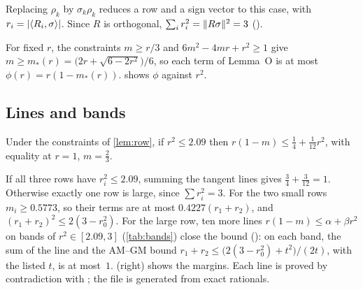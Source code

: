 \documentclass[11pt,a4paper]{article}
\begin{document}
Replacing $\rho_k$ by $\sigma_k\rho_k$ reduces a row and a sign vector to this case, with $r_i=\lvert \langle R_i,\sigma\rangle\rvert$. Since $R$ is orthogonal, $\sum_ir_i^2=\lVert R\sigma\rVert^2=3$ ().

For fixed $r$, the constraints $m\ge r/3$ and $6m^2-4mr+r^2\ge1$ give $m\ge m_*(r)=\bigl(2r+\sqrt{6-2r^2}\bigr)/6$, so each term of Lemma~O is at most $\phi(r)=r(1-m_*(r))$.  shows $\phi$ against $r^2$.

\subsection{Lines and bands}
\begin{lemma}
Under the constraints of \cref{lem:row}, if $r^2\le2.09$ then $r(1-m)\le\tfrac14+\tfrac1{12}r^2$, with equality at $r=1$, $m=\tfrac23$.
\end{lemma}

If all three rows have $r_i^2\le2.09$, summing the tangent lines gives $\tfrac34+\tfrac{3}{12}=1$. Otherwise exactly one row is large, since $\sum r_i^2=3$. For the two small rows $m_i\ge0.5773$, so their terms are at most $0.4227(r_1+r_2)$, and $(r_1+r_2)^2\le2(3-r_0^2)$. For the large row, ten more lines $r(1-m)\le\alpha+\beta r^2$ on bands of $r^2\in[2.09,3]$ (\cref{tab:bands}) close the bound (): on each band, the sum of the line and the AM--GM bound $r_1+r_2\le\bigl(2(3-r_0^2)+t^2\bigr)/(2t)$, with the listed $t$, is at most~$1$.  (right) shows the margins. Each line is proved by contradiction with ; the file  is generated from exact rationals.
\end{document}
